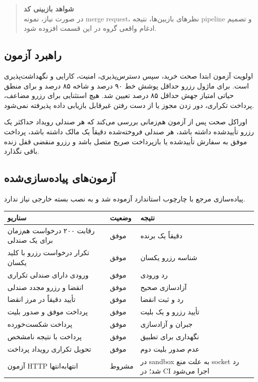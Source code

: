 \documentclass[12pt,a4paper]{article}
\newcommand{\term}[1]{\lr{#1}}
\newcommand{\reservedbox}[2]{%
    \begin{quote}
    \textbf{#1}\\[0.3em]
    #2
    \end{quote}
}
\begin{document}
\reservedbox{شواهد بازبینی کد}{در صورت نیاز، نمونه merge request، نظرهای
بازبین‌ها، نتیجه pipeline و تصمیم ادغام واقعی گروه در این قسمت افزوده شود.}

\subsection{راهبرد آزمون}
اولویت آزمون ابتدا صحت خرید، سپس دسترس‌پذیری، امنیت، کارایی و نگهداشت‌پذیری
است. برای ماژول رزرو حداقل پوشش خط ۹۰ درصد و شاخه ۸۵ درصد و برای منطق حیاتی
امتیاز جهش حداقل ۸۵ درصد تعیین شد. هیچ استثنایی برای رزرو مضاعف، پرداخت تکراری،
دور زدن مجوز یا از دست رفتن غیرقابل بازیابی داده پذیرفته نمی‌شود.

اوراکل صحت پس از آزمون هم‌زمانی بررسی می‌کند که هر صندلی رویداد حداکثر یک رزرو
تأییدشده داشته باشد، هر صندلی فروخته‌شده دقیقاً یک مالک داشته باشد، پرداخت موفق
به سفارش تأییدشده یا بازپرداخت صریح متصل باشد و رزرو منقضی قفل زنده باقی
نگذارد.

\subsection{آزمون‌های پیاده‌سازی‌شده}
پیاده‌سازی مرجع با چارچوب استاندارد \term{unittest} آزموده شد و به نصب بسته
خارجی نیاز ندارد.

\begin{center}
\begin{tabular}{P{7.5cm}C{2.2cm}P{4.2cm}}
\toprule
سناریو & وضعیت & نتیجه\\
\midrule
رقابت ۲۰۰ درخواست هم‌زمان برای یک صندلی & موفق & دقیقاً یک برنده\\
تکرار درخواست رزرو با کلید یکسان & موفق & شناسه رزرو یکسان\\
ورودی دارای صندلی تکراری & موفق & رد ورودی\\
انقضا و رزرو مجدد صندلی & موفق & آزادسازی صحیح\\
تأیید دقیقاً در مرز انقضا & موفق & رد و ثبت انقضا\\
پرداخت موفق و صدور بلیت & موفق & تأیید رزرو و یک بلیت\\
پرداخت شکست‌خورده & موفق & جبران و آزادسازی\\
پرداخت با نتیجه نامشخص & موفق & نگهداری برای تطبیق\\
تحویل تکراری رویداد پرداخت & موفق & عدم صدور بلیت دوم\\
آزمون HTTP انتهابه‌انتها & مشروط & در sandbox به علت منع socket رد شد؛ در CI اجرا می‌شود\\
\bottomrule
\end{tabular}
\end{center}
\end{document}
